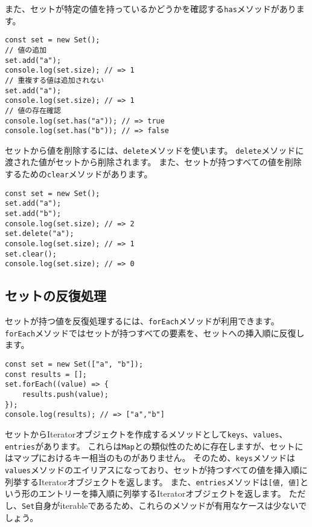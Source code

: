 また、セットが特定の値を持っているかどうかを確認する\texttt{has}メソッドがあります。

\begin{lstlisting}
const set = new Set();
// 値の追加
set.add("a");
console.log(set.size); // => 1
// 重複する値は追加されない
set.add("a");
console.log(set.size); // => 1
// 値の存在確認
console.log(set.has("a")); // => true
console.log(set.has("b")); // => false
\end{lstlisting}

セットから値を削除するには、\texttt{delete}メソッドを使います。
\texttt{delete}メソッドに渡された値がセットから削除されます。
また、セットが持つすべての値を削除するための\texttt{clear}メソッドがあります。

\begin{lstlisting}
const set = new Set();
set.add("a");
set.add("b");
console.log(set.size); // => 2
set.delete("a");
console.log(set.size); // => 1
set.clear();
console.log(set.size); // => 0
\end{lstlisting}

\hypertarget{set-iteration}{%
\subsection{セットの反復処理}\label{set-iteration}}

セットが持つ値を反復処理するには、\texttt{forEach}メソッドが利用できます。
\texttt{forEach}メソッドではセットが持つすべての要素を、セットへの挿入順に反復します。

\begin{lstlisting}
const set = new Set(["a", "b"]);
const results = [];
set.forEach((value) => {
    results.push(value);
});
console.log(results); // => ["a","b"]
\end{lstlisting}

セットからIteratorオブジェクトを作成するメソッドとして\texttt{keys}、\texttt{values}、\texttt{entries}があります。
これらは\texttt{Map}との類似性のために存在しますが、セットにはマップにおけるキー相当のものがありません。
そのため、\texttt{keys}メソッドは\texttt{values}メソッドのエイリアスになっており、セットが持つすべての値を挿入順に列挙するIteratorオブジェクトを返します。
また、\texttt{entries}メソッドは\texttt{[値, 値]}という形のエントリーを挿入順に列挙するIteratorオブジェクトを返します。
ただし、\texttt{Set}自身がiterableであるため、これらのメソッドが有用なケースは少ないでしょう。

